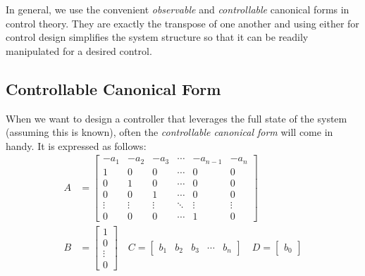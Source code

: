 In general, we use the convenient \textit{observable} and \textit{controllable} canonical forms in control theory. They are exactly the transpose of one another and using either for control design simplifies the system structure so that it can be readily manipulated for a desired control.

\subsection{Controllable Canonical Form}

When we want to design a controller that leverages the full state of the system (assuming this is known), often the \textit{controllable canonical form} will come in handy. It is expressed as follows:
%
\begin{subequations}
	\begin{align}
	A &= \begin{bmatrix} -a_1 & -a_2 & -a_3 & \cdots & -a_{n-1} & -a_n \\
	1 & 0 & 0 & \cdots & 0 & 0 \\
	0 & 1 & 0 & \cdots & 0 & 0 \\
	0 & 0 & 1 & \cdots & 0 & 0 \\
	\vdots & \vdots & \vdots &\ddots & \vdots & \vdots \\
	0 & 0 & 0 & \cdots & 1 & 0 
	\end{bmatrix} 
	\\
		B &= \begin{bmatrix} 1 \\ 0 \\ \vdots \\ 0 \end{bmatrix}
	\quad
	C = \begin{bmatrix} b_1 & b_2 & b_3 & \cdots & b_n \end{bmatrix}
	\quad 
	D = \begin{bmatrix} b_0 \end{bmatrix}
	\end{align}
\end{subequations}


